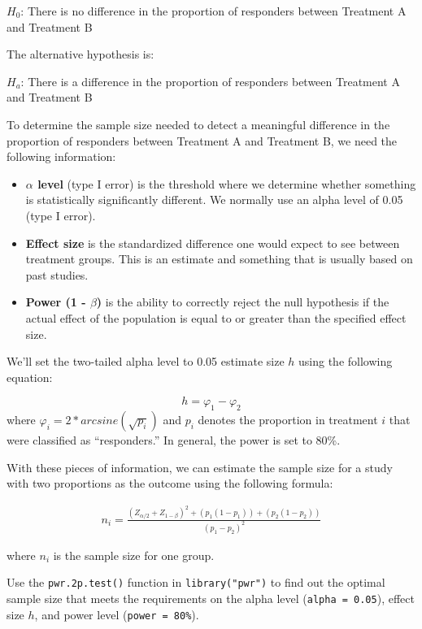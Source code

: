 \documentclass[
]{book}
\begin{document}
\(H_{0}\): There is no difference in the proportion of responders between Treatment A and Treatment B

The alternative hypothesis is:

\(H_{a}\): There is a difference in the proportion of responders between Treatment A and Treatment B

\hfill\break

To determine the sample size needed to detect a meaningful difference in the proportion of responders between Treatment A and Treatment B, we need the following information:

\begin{itemize}
\item
  \textbf{\(\alpha\) level} (type I error) is the threshold where we determine whether something is statistically significantly different. We normally use an alpha level of 0.05 (type I error).
\item
  \textbf{Effect size} is the standardized difference one would expect to see between treatment groups. This is an estimate and something that is usually based on past studies.
\item
  \textbf{Power (1 - \(\beta\))} is the ability to correctly reject the null hypothesis if the actual effect of the population is equal to or greater than the specified effect size.
\end{itemize}

We'll set the two-tailed alpha level to 0.05 estimate size \(h\) using the following equation:

\[
 h = \varphi_{1} - \varphi_{2}
 \]
where \(\varphi_{i} = 2 * arcsine(\sqrt{p_{i}})\) and \(p_{i}\) denotes the proportion in treatment \(i\) that were classified as ``responders.'' In general, the power is set to 80\%.

With these pieces of information, we can estimate the sample size for a study with two proportions as the outcome using the following formula:

\[
\begin{aligned}
n_{i} = \frac{(Z_{\alpha/2} + Z_{1 - \beta})^2 + (p_{1}(1 - p_{1})) + (p_{2}(1 - p_{2}))}{(p_{1} - p_{2})^2}
\end{aligned}
\]

where \(n_{i}\) is the sample size for one group.

Use the \texttt{pwr.2p.test()} function in \texttt{library("pwr")} to find out the optimal sample size that meets the requirements on the alpha level (\texttt{alpha\ =\ 0.05}), effect size \(h\), and power level (\texttt{power\ =\ 80\%}).
\end{document}
